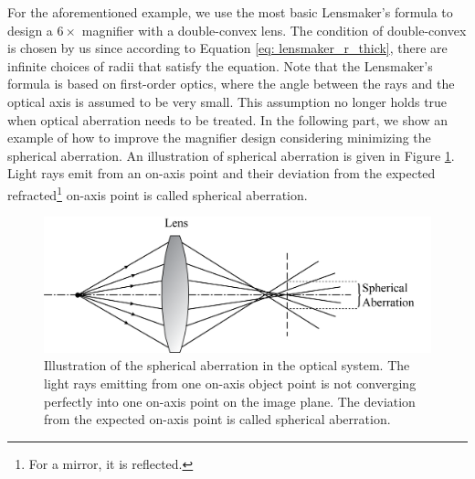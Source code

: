 For the aforementioned example, we use the most basic Lensmaker's formula to design a $6 \times$ magnifier with a double-convex lens.  The condition of double-convex is chosen by us since according to Equation \ref{eq: lensmaker_r_thick}, there are infinite choices of radii that satisfy the equation. Note that the Lensmaker's formula is based on first-order optics, where the angle between the rays and the optical axis is assumed to be very small. This assumption no longer holds true when optical aberration needs to be treated. In the following part, we show an example of how to improve the magnifier design considering minimizing the spherical aberration. An illustration of spherical aberration is given in Figure \ref{fig: spherical aberration}. Light rays emit from an on-axis point and their deviation from the expected refracted\footnote{For a mirror, it is reflected.} on-axis point is called spherical aberration. 
\begin{figure}
    \centering
    \includegraphics[scale=0.58]{chapter-1/figures/illus_spherical_abe.png}
    \caption{Illustration of the spherical aberration in the optical system. The light rays emitting from one on-axis object point is not converging perfectly into one on-axis point on the image plane. The deviation from the expected on-axis point is called spherical aberration.}
    \label{fig: spherical aberration}
\end{figure} 

